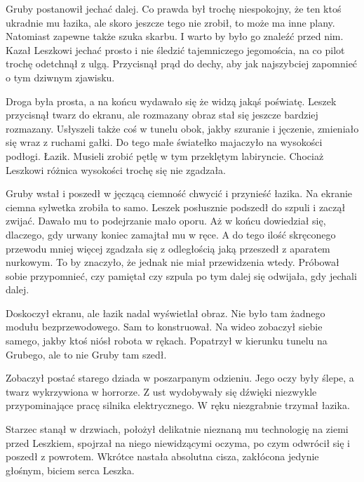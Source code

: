 
Gruby postanowił jechać dalej. Co prawda był trochę niespokojny, że ten ktoś ukradnie mu łazika, ale skoro jeszcze tego nie zrobił, to może ma inne plany.
Natomiast zapewne także szuka skarbu. I warto by było go znaleźć przed nim.
Kazał Leszkowi jechać prosto i nie śledzić tajemniczego jegomościa, na co pilot trochę odetchnął z ulgą.
Przycisnął prąd do dechy, aby jak najszybciej zapomnieć o tym dziwnym zjawisku.

Droga była prosta, a na końcu wydawało się że widzą jakąś poświatę.
Leszek przycisnął twarz do ekranu, ale rozmazany obraz stał się jeszcze bardziej rozmazany.
Usłyszeli także coś w tunelu obok, jakby szuranie i jęczenie, zmieniało się wraz z ruchami gałki. Do tego małe światełko majaczyło na wysokości podłogi. Łazik.
Musieli zrobić pętlę w tym przeklętym labiryncie.
Chociaż Leszkowi różnica wysokości trochę się nie zgadzała.

Gruby wstał i poszedł w jęczącą ciemność chwycić i przynieść łazika.
Na ekranie ciemna sylwetka zrobiła to samo.
Leszek posłusznie podszedł do szpuli i zaczął zwijać.
Dawało mu to podejrzanie mało oporu.
Aż w końcu dowiedział się, dlaczego, gdy urwany koniec zamajtał mu w ręce.
A do tego ilość skręconego przewodu mniej więcej zgadzała się z odległością jaką przeszedł z aparatem nurkowym.
To by znaczyło, że jednak nie miał przewidzenia wtedy.
Próbował sobie przypomnieć, czy pamiętał czy szpula po tym dalej się odwijała, gdy jechali dalej.

Doskoczył ekranu, ale łazik nadal wyświetlał obraz.
Nie było tam żadnego modułu bezprzewodowego. Sam to konstruował.
Na wideo zobaczył siebie samego, jakby ktoś niósł robota w rękach.
Popatrzył w kierunku tunelu na Grubego, ale to nie Gruby tam szedł.

Zobaczył postać starego dziada w poszarpanym odzieniu.
Jego oczy były ślepe, a twarz wykrzywiona w horrorze.
Z ust wydobywały się dźwięki niezwykle przypominające pracę silnika elektrycznego.
W ręku niezgrabnie trzymał łazika.

Starzec stanął w drzwiach, położył delikatnie nieznaną mu technologię na ziemi przed Leszkiem, spojrzał na niego niewidzącymi oczyma, po czym odwrócił się i poszedł z powrotem.
Wkrótce nastała absolutna cisza, zakłócona jedynie głośnym, biciem serca Leszka.

